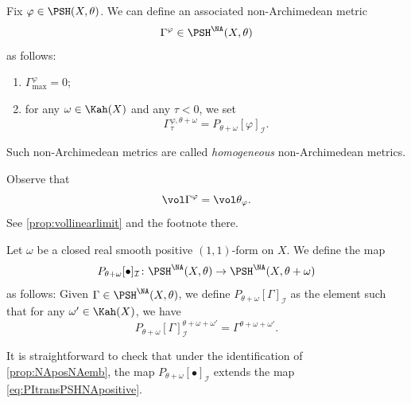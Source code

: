 \begin{example}\label{ex:embedpshintona}
    Fix $\varphi\in \PSH(X,\theta)$. We can define an associated non-Archimedean metric
    \[
    \Gamma^{\varphi}\in \PSH^{\NA}(X,\theta)
    \]
    as follows:
    \begin{enumerate}
        \item\label{itm:ex:embedpshintona:1} $\Gamma^{\varphi}_{\max}=0$;
        \item\label{itm:ex:embedpshintona:2} for any $\omega\in \Kah(X)$ and any $\tau<0$, we set
        \[
        \Gamma^{\varphi,\theta+\omega}_{\tau}=P_{\theta+\omega}[\varphi]_{\mathcal{I}}.
        \]
    \end{enumerate}
    Such non-Archimedean metrics are called \emph{homogeneous} non-Archimedean metrics.

    Observe that
    \[
    \vol \Gamma^{\varphi}=\vol \theta_{\varphi}.
    \]
    See \cref{prop:vollinearlimit} and the footnote there.
\end{example}

\begin{definition}\label{def:PSHNAtrangeneral}
    Let $\omega$ be a closed real smooth positive $(1,1)$-form on $X$. We define the map
    \[
    P_{\theta+\omega}[\bullet]_{\mathcal{I}}\colon \PSH^{\NA}(X,\theta)\rightarrow \PSH^{\NA}(X,\theta+\omega)
    \]
    as follows: Given $\Gamma\in \PSH^{\NA}(X,\theta)$, we define $P_{\theta+\omega}[\Gamma]_{\mathcal{I}}$ as the element such that for any $\omega'\in \Kah(X)$, we have
    \[
    P_{\theta+\omega}[\Gamma]_{\mathcal{I}}^{\theta+\omega+\omega'}=\Gamma^{\theta+\omega+\omega'}.
    \]
\end{definition}
It is straightforward to check that under the identification of \cref{prop:NAposNAemb}, the map $P_{\theta+\omega}[\bullet]_{\mathcal{I}}$ extends the map \eqref{eq:PItransPSHNApositive}.

